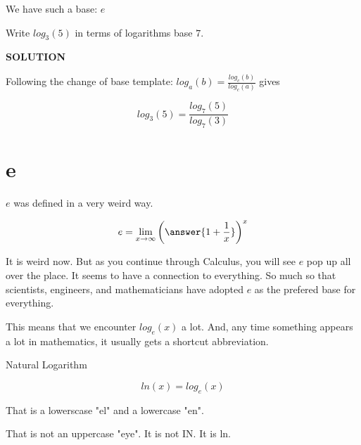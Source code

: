 \documentclass{ximera}
\begin{document}
We have such a base: $e$


\begin{example}


Write $log_3(5)$ in terms of logarithms base $7$.


\textbf{\textcolor{purple!50!blue!90!black}{SOLUTION}}


Following the change of base template: $log_a(b)  =  \frac{log_c(b)}{log_c(a)} $ gives



\[   log_3(5)  =  \frac{log_7(5)}{log_7(3)}         \]




\end{example}




















\section{e}



$e$ was defined in a very weird way.

\[   e = \lim_{x \to \infty}  \left(\answer{1 + \frac{1}{x}}\right)^x      \]


It is weird now.  But as you continue through Calculus, you will see $e$ pop up all over the place.  It seems to have a connection to everything.  So much so that scientists, engineers, and mathematicians have  adopted $e$ as the prefered base for everything.


This means that we encounter $log_e(x)$ a lot.  And, any time something appears a lot in mathematics, it usually gets a shortcut abbreviation.




\begin{definition}  Natural Logarithm


\[     ln(x) = log_e(x) \]


That is a lowerscase "el" and a lowercase "en".


\end{definition}


That is not an uppercase "eye".  It is not IN.  It is ln.
\end{document}
